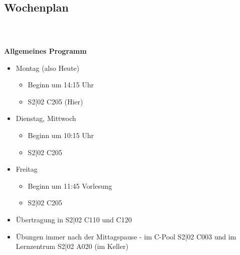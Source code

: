 \subsection{Wochenplan}
\begin{frame}
	\frametitle{\insertsectionhead \\ {\small \insertsubsectionhead}}
	\textbf{Allgemeines Programm}
	\begin{itemize}
		\item Montag (also Heute)
		\begin{itemize}
			\item Beginn um 14:15 Uhr
			\item S2|02 C205 (Hier)
		\end{itemize}
		\item Dienstag, Mittwoch
		\begin{itemize}
			\item Beginn um 10:15 Uhr
			\item S2|02 C205
		\end{itemize}
		\item Freitag
		\begin{itemize}
			\item Beginn um 11:45 Vorlesung
			\item S2|02 C205
		\end{itemize}
		\item Übertragung in S2|02 C110 und C120
		\item Übungen immer nach der Mittagspause - im C-Pool S2|02 C003 und im Lernzentrum S2|02 A020 (im Keller)
	\end{itemize}
\end{frame}

